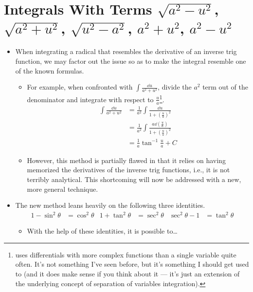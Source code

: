 \documentclass[../main.tex]{subfiles}
\begin{document}
\section{Integrals With Terms \texorpdfstring{$\sqrt{a^2-u^2}$}{TEXT}, \texorpdfstring{$\sqrt{a^2+u^2}$}{TEXT}, \texorpdfstring{$\sqrt{u^2-a^2}$}{TEXT}, \texorpdfstring{$a^2+u^2$}{TEXT}, \texorpdfstring{$a^2-u^2$}{TEXT}}
\begin{itemize}
    \item When integrating a radical that resembles the derivative of an inverse trig function, we may factor out the issue so as to make the integral resemble one of the known formulas.
    \begin{itemize}
        \item For example, when confronted with $\int\frac{\dd u}{a^2+u^2}$, divide the $a^2$ term out of the denominator and integrate with respect to $\frac{u}{a}$\footnote{\textcite{bib:Thomas} uses differentials with more complex functions than a single variable quite often. It's not something I've seen before, but it's something I should get used to (and it does make sense if you think about it --- it's just an extension of the underlying concept of separation of variables integration).}.
        \begin{align*}
            \int\frac{\dd u}{a^2+u^2} &= \frac{1}{a^2}\int\frac{\dd u}{1+\left( \frac{u}{a} \right)^2}\\
            &= \frac{1}{a^2}\int\frac{a\dd{\left( \frac{u}{a} \right)}}{1+\left( \frac{u}{a} \right)^2}\\
            &= \frac{1}{a}\tan^{-1}\frac{u}{a}+C
        \end{align*}
        \item However, this method is partially flawed in that it relies on having memorized the derivatives of the inverse trig functions, i.e., it is not terribly analytical. This shortcoming will now be addressed with a new, more general technique.
    \end{itemize}
    \item The new method leans heavily on the following three identities.
    \begin{align*}
        1-\sin^2\theta &= \cos^2\theta&
        1+\tan^2\theta &= \sec^2\theta&
        \sec^2\theta-1 &= \tan^2\theta
    \end{align*}
    \begin{itemize}
        \item With the help of these identities, it is possible to\dots
        \begin{enumerate}

\end{enumerate}
\end{itemize}
\end{itemize}
\end{document}
